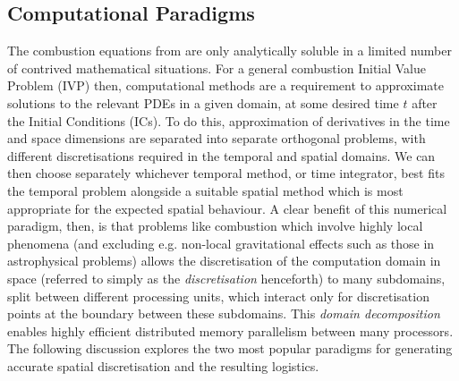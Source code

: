 \subsection{Computational Paradigms}

The combustion equations from  are only analytically soluble in a limited number of contrived mathematical situations. For a general combustion Initial Value Problem (IVP) then, computational methods are a requirement to approximate solutions to the relevant PDEs in a given domain, at some desired time $t$ after the Initial Conditions (ICs). To do this, approximation of derivatives in the time and space dimensions are separated into separate orthogonal problems, with different discretisations required in the temporal and spatial domains. We can then choose separately whichever temporal method, or time integrator, best fits the temporal problem alongside a suitable spatial method which is most appropriate for the expected spatial behaviour. A clear benefit of this numerical paradigm, then, is that problems like combustion which involve highly local phenomena (and excluding e.g. non-local gravitational effects such as those in astrophysical problems) allows the discretisation of the computation domain in space (referred to simply as the \emph{discretisation} henceforth) to many subdomains, split between different processing units, which interact only for discretisation points at the boundary between these subdomains. This \emph{domain decomposition} enables highly efficient distributed memory parallelism between many processors. The following discussion explores the two most popular paradigms for generating accurate spatial discretisation and the resulting logistics.

